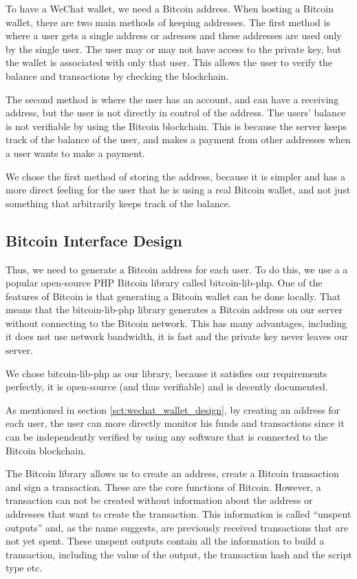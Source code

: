 To have a WeChat wallet, we need a Bitcoin address. When hosting a Bitcoin wallet, there are two main methods of keeping addresses. The first method is where a user gets a single address or adresses and these addresses are used only by the single user. The user may or may not have access to the private key, but the wallet is associated with only that user. This allows the user to verify the balance and transactions by checking the blockchain. 

The second method is where the user has an account, and can have a receiving address, but the user is not directly in control of the address. The users' balance is not verifiable by using the Bitcoin blockchain. This is because the server keeps track of the balance of the user, and makes a payment from other addresses when a user wants to make a payment.

We chose the first method of storing the address, because it is simpler and has a more direct feeling for the user that he is using a real Bitcoin wallet, and not just something that arbitrarily keeps track of the balance.

\subsection{Bitcoin Interface Design}
\label{sct:bitcoin_interface_design}

Thus, we need to generate a Bitcoin address for each user. To do this, we use a a popular open-source PHP Bitcoin library called bitcoin-lib-php. One of the features of Bitcoin is that generating a Bitcoin wallet can be done locally. That means that the bitcoin-lib-php library generates a Bitcoin address on our server without connecting to the Bitcoin network. This has many advantages, including it does not use network bandwidth, it is fast and the private key never leaves our server.

We chose bitcoin-lib-php as our library, because it satisfies our requirements perfectly, it is open-source (and thus verifiable) and is decently documented. 

As mentioned in section \ref{sct:wechat_wallet_design}, by creating an address for each user, the user can more directly monitor his funds and transactions since it can be independently verified by using any software that is connected to the Bitcoin blockchain.

The Bitcoin library allows us to create an address, create a Bitcoin transaction and sign a transaction. These are the core functions of Bitcoin. However, a transaction can not be created without information about the address or addresses that want to create the transaction. This information is called ``unspent outputs'' and, as the name suggests, are previously received transactions that are not yet spent. These unspent outputs contain all the information to build a transaction, including the value of the output, the transaction hash and the script type etc.

